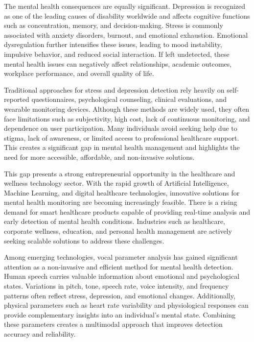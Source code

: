 The mental health consequences are equally significant. Depression is recognized as one of the leading causes of disability worldwide and affects cognitive functions such as concentration, memory, and decision-making. Stress is commonly associated with anxiety disorders, burnout, and emotional exhaustion. Emotional dysregulation further intensifies these issues, leading to mood instability, impulsive behavior, and reduced social interaction. If left undetected, these mental health issues can negatively affect relationships, academic outcomes, workplace performance, and overall quality of life.

Traditional approaches for stress and depression detection rely heavily on self-reported questionnaires, psychological counseling, clinical evaluations, and wearable monitoring devices. Although these methods are widely used, they often face limitations such as subjectivity, high cost, lack of continuous monitoring, and dependence on user participation. Many individuals avoid seeking help due to stigma, lack of awareness, or limited access to professional healthcare support. This creates a significant gap in mental health management and highlights the need for more accessible, affordable, and non-invasive solutions.

This gap presents a strong entrepreneurial opportunity in the healthcare and wellness technology sector. With the rapid growth of Artificial Intelligence, Machine Learning, and digital healthcare technologies, innovative solutions for mental health monitoring are becoming increasingly feasible. There is a rising demand for smart healthcare products capable of providing real-time analysis and early detection of mental health conditions. Industries such as healthcare, corporate wellness, education, and personal health management are actively seeking scalable solutions to address these challenges.

Among emerging technologies, vocal parameter analysis has gained significant attention as a non-invasive and efficient method for mental health detection. Human speech carries valuable information about emotional and psychological states. Variations in pitch, tone, speech rate, voice intensity, and frequency patterns often reflect stress, depression, and emotional changes. Additionally, physical parameters such as heart rate variability and physiological responses can provide complementary insights into an individual's mental state. Combining these parameters creates a multimodal approach that improves detection accuracy and reliability.

